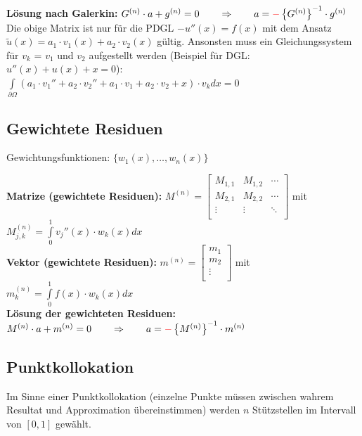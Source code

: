 \textbf{Lösung nach Galerkin:} $G^{(n)}\cdot a+g^{(n)}=0\qquad \Rightarrow
\qquad a=\textcolor{red}{\mathbf{-}}\left\{G^{(n)}\right\}^{-1}\cdot g^{(n)}$\\

Die obige Matrix ist nur für die PDGL $-u''(x) = f(x)$ mit dem Ansatz
$\tilde{u}(x) = a_1 \cdot v_1(x) + a_2 \cdot v_2(x)$ gültig. Ansonsten muss ein
Gleichungssystem für $v_k$ = $v_1$ und $v_2$ aufgestellt werden (Beispiel
für DGL: $u''(x) + u(x) + x = 0$):\\
$\int\limits_{\partial \Omega}{(a_1 \cdot v_1'' + a_2 \cdot v_2'' + a_1 \cdot
v_1 + a_2 \cdot v_2 + x) \cdot v_k dx} = 0$

\subsection{Gewichtete Residuen}

Gewichtungsfunktionen: $\{w_1(x),\ldots,w_n(x)\}$

\textbf{Matrize (gewichtete Residuen): }
$M^{(n)}=\begin{bmatrix}
	M_{1,1}& M_{1,2}&\cdots\\
	M_{2,1}& M_{2,2}&\cdots\\
	\vdots & \vdots &\ddots\\
\end{bmatrix}$ \qquad mit \qquad $M_{j,k}^{(n)}=\int\limits_{0}^{1}{v_j''(x)\cdot w_k(x) dx}$\\
\textbf{Vektor (gewichtete Residuen): } 
$m^{(n)}=\begin{bmatrix}
	m_1\\
	m_2\\
	\vdots\\
\end{bmatrix}$ \qquad mit \qquad $m_{k}^{(n)}=\int\limits_{0}^{1}{f(x)\cdot w_k(x) dx}$\\

\textbf{Lösung der gewichteten Residuen:} $M^{(n)}\cdot a+m^{(n)}=0\qquad \Rightarrow \qquad a=\textcolor{red}{\mathbf{-}}\left\{M^{(n)}\right\}^{-1}\cdot m^{(n)}$

\subsection{Punktkollokation}
Im Sinne einer Punktkollokation (einzelne Punkte müssen zwischen wahrem Resultat und Approximation übereinstimmen) werden $n$ Stützstellen im Intervall von $[0,1]$ gewählt.\\

